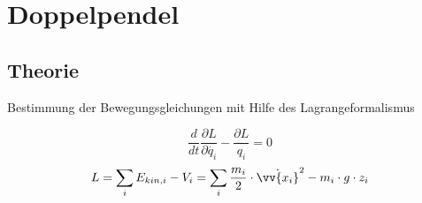 \section{Doppelpendel}
\subsection{Theorie}
\begin{frame}{Bestimmung der Bewegungsgleichungen mit Hilfe des Lagrangeformalismus}
	\begin{block}
		
		\begin{equation}
			\frac{d}{dt}\frac{\partial L}{\partial\dot{q_i}}-\frac{\partial L}{q_i} =0
		\label{lagrangegl}
		\end{equation}
		\begin{equation}
			 L=\sum_i E_{kin,i}-V_i=\sum_i \frac{m_i}{2}\cdot\dot{\vv{x_i}}^2 - m_i \cdot g \cdot z_i
		\end{equation}
	\end{block}
\end{frame}
